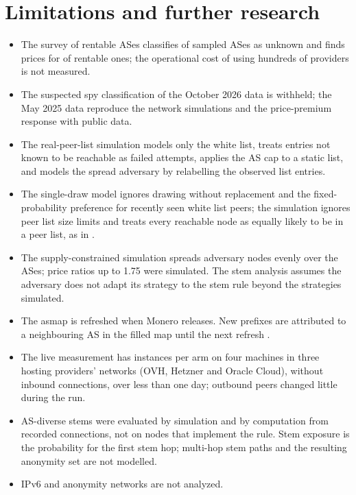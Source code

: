 \documentclass[english]{mrl}
\theoremstyle{plain}
\begin{document}
\section{Limitations and further research}

\begin{itemize}
\item The survey of rentable ASes classifies \svU{} of \svn{} sampled ASes as unknown and finds prices for \svPriced{} of \svR{} rentable ones; the operational cost of using hundreds of providers is not measured.
\item The suspected spy classification of the October 2026 data is withheld; the May 2025 data reproduce the network simulations and the price-premium response with public data.
\item The real-peer-list simulation models only the white list, treats entries not known to be reachable as failed attempts, applies the AS cap to a static list, and models the spread adversary by relabelling the observed list entries.
\item The single-draw model ignores drawing without replacement and the fixed-probability preference for recently seen white list peers; the simulation ignores peer list size limits and treats every reachable node as equally likely to be in a peer list, as in \cite{Rucknium2025}.
\item The supply-constrained simulation spreads adversary nodes evenly over the ASes; price ratios up to 1.75 were simulated. The stem analysis assumes the adversary does not adapt its strategy to the stem rule beyond the strategies simulated.
\item The asmap is refreshed when Monero releases. New prefixes are attributed to a neighbouring AS in the filled map until the next refresh \cite{AsmapData}.
\item The live measurement has \abInst{} instances per arm on four machines in three hosting providers' networks (OVH, Hetzner and Oracle Cloud), without inbound connections, over less than one day; outbound peers changed little during the run.
\item AS-diverse stems were evaluated by simulation and by computation from recorded connections, not on nodes that implement the rule. Stem exposure is the probability for the first stem hop; multi-hop stem paths and the resulting anonymity set \cite{Sharma2022} are not modelled.
\item IPv6 and anonymity networks are not analyzed.
\end{itemize}
\end{document}
